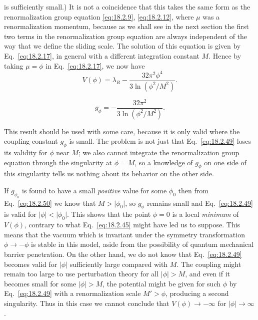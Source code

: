 is sufficiently small.) It is not a coincidence that this takes the same
form as the renormalization group equation \eqref{eq:18.2.9},
\eqref{eq:18.2.12}, where $\mu$ was a renormalization momentum, because as we
shall see in the next section the first two terms in the renormalization group
equation are always independent of the way that we define the sliding scale.
The solution of this equation is given by Eq.~\eqref{eq:18.2.17}, in general
with a different integration constant $M$. Hence by taking $\mu=\phi$ in
Eq.~\eqref{eq:18.2.17}, we now have
\begin{equation}
V(\phi)=\lambda_R-\frac{32\pi^2\phi^4}{3\ln(\phi^2/M^2)}.
\tag{18.2.49}\label{eq:18.2.49}
\end{equation}
\par\noindent
\begin{equation}
g_\phi=-\frac{32\pi^2}{3\ln(\phi^2/M^2)}.
\tag{18.2.50}\label{eq:18.2.50}
\end{equation}
\par\noindent
This result should be used with some care, because it is only valid where the
coupling constant $g_\phi$ is small. The problem is not just that
Eq.~\eqref{eq:18.2.49} loses its validity for $\phi$ near $M$; we also cannot
integrate the renormalization group equation through the singularity at
$\phi=M$, so a knowledge of $g_\phi$ on one side of this singularity tells us
nothing about its behavior on the other side.

If $g_{\phi_0}$ is found to have a small \emph{positive} value for some
$\phi_0$ then from Eq.~\eqref{eq:18.2.50} we know that $M>\lvert\phi_0\rvert$,
so $g_\phi$ remains small and Eq.~\eqref{eq:18.2.49} is valid for
$\lvert\phi\rvert<\lvert\phi_0\rvert$. This shows that the point $\phi=0$ is
a local \emph{minimum} of $V(\phi)$, contrary to what Eq.~\eqref{eq:18.2.45}
might have led us to suppose. This means that the vacuum which is invariant
under the symmetry transformation $\phi\to-\phi$ is stable in this model,
aside from the possibility of quantum mechanical barrier penetration. On the
other hand, we do not know that Eq.~\eqref{eq:18.2.49} becomes valid for
$\lvert\phi\rvert$ sufficiently large compared with $M$. The coupling might
remain too large to use perturbation theory for all $\lvert\phi\rvert>M$, and
even if it becomes small for some $\lvert\phi\rvert>M$, the potential might
be given for such $\phi$ by Eq.~\eqref{eq:18.2.49} with a renormalization scale
$M'>\phi$, producing a second singularity. Thus in this case we cannot
conclude that $V(\phi)\to-\infty$ for $\lvert\phi\rvert\to\infty$.

